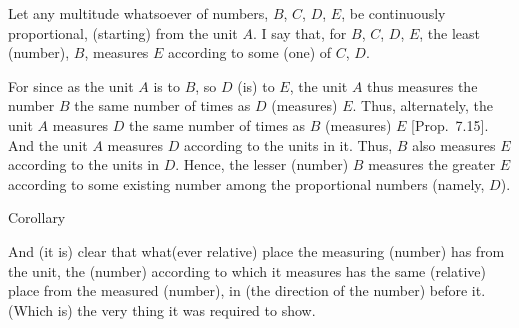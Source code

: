 \begin{Parallel}{}{}
{Let any multitude whatsoever of numbers,  $B$, $C$, $D$, $E$, be continuously proportional, (starting) from the unit $A$. I say that, for $B$, $C$, $D$, $E$, the least (number), $B$, measures $E$ according to some (one) of
$C$, $D$.

For since as the unit $A$ is to $B$, so $D$ (is) to $E$,  the unit $A$ thus measures the number $B$ the same number of times as $D$ (measures) $E$. Thus,
alternately, the unit $A$ measures $D$ the same number of times as $B$
(measures) $E$ [Prop.~7.15]. And the unit $A$ measures $D$ according to the units in it. Thus, $B$ also measures $E$ according to the units in $D$. Hence, the lesser (number) $B$
measures the greater $E$ according to some existing number among the
proportional numbers (namely, $D$). \\

\begin{center}
{\large Corollary}
\end{center}\vspace*{-7pt}

And (it is) clear that what(ever relative) place the measuring (number) has from the unit,
the  (number) according to which it measures has the same (relative) place from the measured (number), in (the direction of the number)
before it. (Which is) the very thing it was required to show.}
\end{Parallel}


